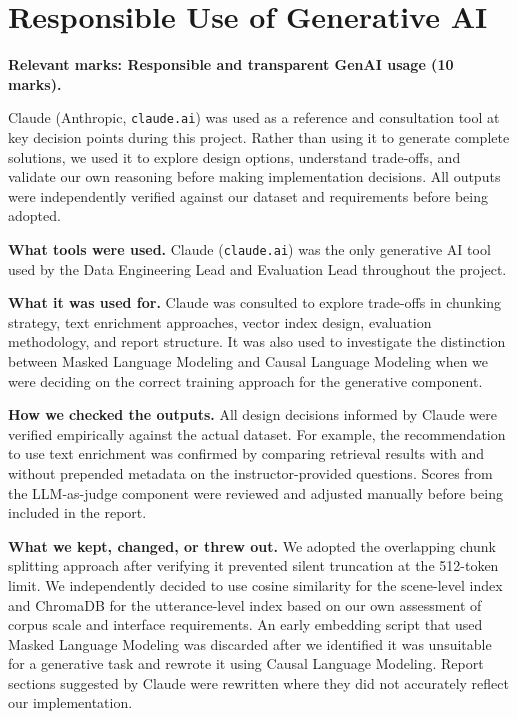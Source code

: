 \documentclass[10pt,conference]{IEEEtran}
\begin{document}
\section{Responsible Use of Generative AI}
\label{sec:genai}

\textbf{Relevant marks: Responsible and transparent GenAI usage (10 marks).}

Claude (Anthropic, \texttt{claude.ai}) was used as a reference and
consultation tool at key decision points during this project. Rather
than using it to generate complete solutions, we used it to explore
design options, understand trade-offs, and validate our own reasoning
before making implementation decisions. All outputs were independently
verified against our dataset and requirements before being adopted.

\textbf{What tools were used.} Claude (\texttt{claude.ai}) was the
only generative AI tool used by the Data Engineering Lead and
Evaluation Lead throughout the project.

\textbf{What it was used for.} Claude was consulted to explore
trade-offs in chunking strategy, text enrichment approaches, vector
index design, evaluation methodology, and report structure. It was
also used to investigate the distinction between Masked Language
Modeling and Causal Language Modeling when we were deciding on the
correct training approach for the generative component.

\textbf{How we checked the outputs.} All design decisions informed
by Claude were verified empirically against the actual dataset. For
example, the recommendation to use text enrichment was confirmed by
comparing retrieval results with and without prepended metadata on
the instructor-provided questions. Scores from the LLM-as-judge
component were reviewed and adjusted manually before being included
in the report.

\textbf{What we kept, changed, or threw out.} We adopted the
overlapping chunk splitting approach after verifying it prevented
silent truncation at the 512-token limit. We independently decided
to use cosine similarity for the scene-level index and ChromaDB for
the utterance-level index based on our own assessment of corpus scale
and interface requirements. An early embedding script that used
Masked Language Modeling was discarded after we identified it was
unsuitable for a generative task and rewrote it using Causal Language
Modeling. Report sections suggested by Claude were rewritten where
they did not accurately reflect our implementation.
\end{document}
